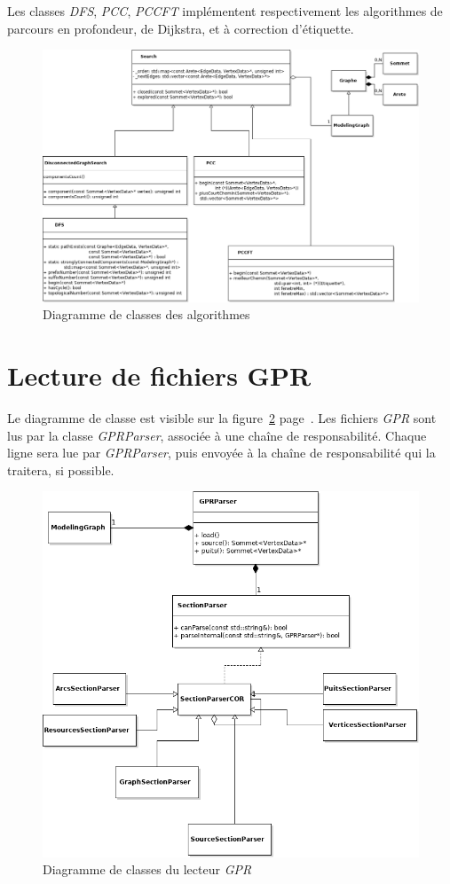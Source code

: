 \documentclass{scrreprt}
\begin{document}
	Les classes \textit{DFS}, \textit{PCC}, \textit{PCCFT} implémentent respectivement les algorithmes de parcours en profondeur, de Dijkstra, et à correction d'étiquette.
	\begin{figure}[!h]
		\includegraphics[scale=0.5]{uml_algo}
		\caption{\label{uml_algo} Diagramme de classes des algorithmes}
	\end{figure}
	\newpage

	\section{Lecture de fichiers GPR}
	Le diagramme de classe est visible sur la figure~\ref{uml_gpr} page~\pageref{uml_gpr}.
	Les fichiers \textit{GPR} sont lus par la classe \textit{GPRParser}, associée à une chaîne de responsabilité. Chaque ligne sera lue par \textit{GPRParser}, puis envoyée à la chaîne de responsabilité qui la traitera, si possible.
	
	\begin{figure}[!h]
		\includegraphics[scale=0.7]{uml_gpr}
		\caption{\label{uml_gpr} Diagramme de classes du lecteur \textit{GPR}}
	\end{figure}
	
\end{document}
